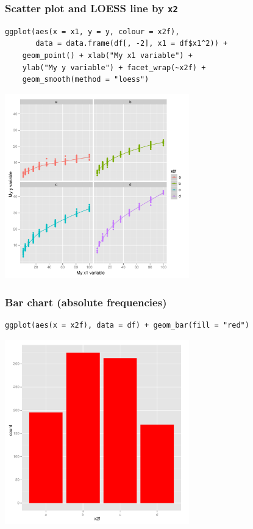 \documentclass[bigger]{beamer}
\begin{document}
\begin{frame}[fragile,shrink = 10]
\frametitle{Scatter plot and LOESS line by \texttt{x2}}
\label{sec-3_9}

\lstset{language=R}
\begin{lstlisting}
ggplot(aes(x = x1, y = y, colour = x2f), 
       data = data.frame(df[, -2], x1 = df$x1^2)) + 
    geom_point() + xlab("My x1 variable") + 
    ylab("My y variable") + facet_wrap(~x2f) +
    geom_smooth(method = "loess")
\end{lstlisting}



\includegraphics[width=0.6\textwidth]{../graphs/ggplot2_scatter_loess.pdf}
\end{frame}
\begin{frame}[fragile,shrink = 10]
\frametitle{Bar chart (absolute frequencies)}
\label{sec-3_10}

\lstset{language=R}
\begin{lstlisting}
ggplot(aes(x = x2f), data = df) + geom_bar(fill = "red")
\end{lstlisting}



\includegraphics[width=0.6\textwidth]{../graphs/ggplot2_barchart_n.pdf}
\end{frame}
\end{document}
